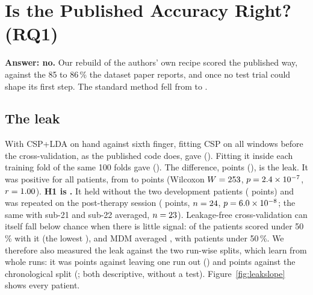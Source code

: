 \section{Is the Published Accuracy Right? (RQ1)}\label{sec:res-leak}

\textbf{Answer: no.} Our rebuild of the authors' own recipe scored
\pct{\rqOneCspLdaReplicaPaperReplicaMean} the published way, against the 85 to 86\,\% the
dataset paper reports, and \pct{\rqOneCspLdaReplicaCvLeakfreeMean} once no test trial could
shape its first step. The standard method fell from \pct{\rqOneCspLdaPaperReplicaMean} to
\pct{\rqOneCspLdaCvLeakfreeMean}.

\subsection{The leak}
With CSP+LDA on hand against sixth finger, fitting CSP on all windows before the
cross-validation, as the published code does, gave \pct{\rqOneCspLdaPaperReplicaMean}
(\ci{\rqOneCspLdaPaperReplicaCiLo}{\rqOneCspLdaPaperReplicaCiHi}). Fitting it inside each
training fold of the same 100 folds gave \pct{\rqOneCspLdaCvLeakfreeMean}
(\ci{\rqOneCspLdaCvLeakfreeCiLo}{\rqOneCspLdaCvLeakfreeCiHi}). The difference,
\rqOneHOneDiff{} points (\cipts{\rqOneHOneDiffCiLo}{\rqOneHOneDiffCiHi}), is the leak.
It was positive for all \rqOneHOnePositive{} patients, from \rqOneHOneDiffMin{} to
\rqOneHOneDiffMax{} points (Wilcoxon $W = 253$, $p = 2.4\times10^{-7}$, $r =
1.00$). \textbf{H1 is \rqOneHOneCategory.} It held without the two development
patients (\rqOneHOneNoDevDiff{} points) and was repeated on the post-therapy session
(\rqOneHOnePostDiff{} points, $n = 24$, $p = 6.0\times10^{-8}$; the same
with sub-21 and sub-22 averaged, $n = 23$). Leakage-free
cross-validation can itself fall below chance when there is little signal:
\rqOneCspLdaCvLeakfreeNBelowChance{} of the \nPre{} patients scored under 50\,\% with it
(the lowest \pct{\rqOneCspLdaCvLeakfreeMin}), and MDM averaged
\pct{\rqOneMdmCvLeakfreeMean}, with \rqOneMdmCvLeakfreeNBelowChance{} patients under 50\,\%.
We therefore also measured the leak against the two run-wise splits, which learn from
whole runs: it was \rqOneCspLdaPaperReplicaMinusLoroDiff{} points against leaving one run
out (\cipts{\rqOneCspLdaPaperReplicaMinusLoroDiffCiLo}{\rqOneCspLdaPaperReplicaMinusLoroDiffCiHi})
and \rqOneCspLdaPaperReplicaMinusChronoDiff{} points against the chronological split
(\cipts{\rqOneCspLdaPaperReplicaMinusChronoDiffCiLo}{\rqOneCspLdaPaperReplicaMinusChronoDiffCiHi};
both descriptive, without a test). Figure~\ref{fig:leakslope} shows every patient.

